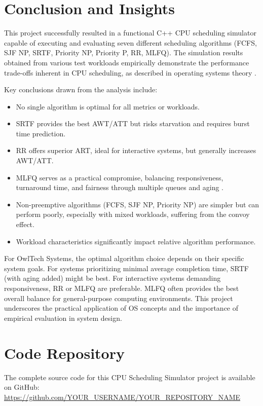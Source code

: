 \documentclass[12pt]{article}
\begin{document}
\section{Conclusion and Insights}
This project successfully resulted in a functional C++ CPU scheduling simulator capable of executing and evaluating seven different scheduling algorithms (FCFS, SJF NP, SRTF, Priority NP, Priority P, RR, MLFQ). The simulation results obtained from various test workloads empirically demonstrate the performance trade-offs inherent in CPU scheduling, as described in operating systems theory \citep{silberschatz2018operating}.

Key conclusions drawn from the analysis include:
\begin{itemize}
    \item No single algorithm is optimal for all metrics or workloads.
    \item SRTF provides the best AWT/ATT but risks starvation and requires burst time prediction.
    \item RR offers superior ART, ideal for interactive systems, but generally increases AWT/ATT.
    \item MLFQ serves as a practical compromise, balancing responsiveness, turnaround time, and fairness through multiple queues and aging \citep{nauer}.
    \item Non-preemptive algorithms (FCFS, SJF NP, Priority NP) are simpler but can perform poorly, especially with mixed workloads, suffering from the convoy effect.
    \item Workload characteristics significantly impact relative algorithm performance.
\end{itemize}

For OwlTech Systems, the optimal algorithm choice depends on their specific system goals. For systems prioritizing minimal average completion time, SRTF (with aging added) might be best. For interactive systems demanding responsiveness, RR or MLFQ are preferable. MLFQ often provides the best overall balance for general-purpose computing environments. This project underscores the practical application of OS concepts and the importance of empirical evaluation in system design.

\section{Code Repository}
The complete source code for this CPU Scheduling Simulator project is available on GitHub:
\url{https://github.com/YOUR_USERNAME/YOUR_REPOSITORY_NAME}

\newpage


\end{document}
